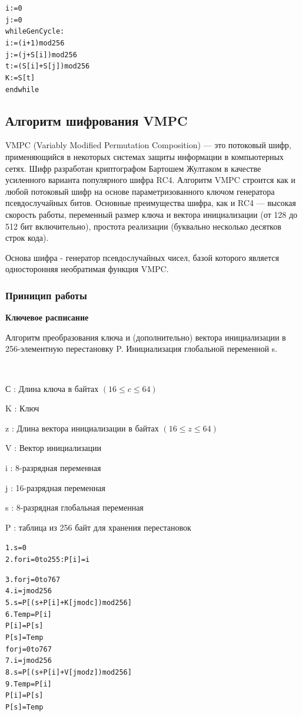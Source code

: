 \documentclass[a4paper]{report}
\begin{document}
\begin{alltt}
		i := 0
		j := 0
		while GenCycle:
    			i := ( i + 1 ) mod 256
    			j := ( j + S[i] ) mod 256
    			t := ( S[i] + S[j] ) mod 256
    			K := S[t] 
		endwhile
\end{alltt}

\newpage
\subsection{Алгоритм шифрования VMPC}
VMPC (Variably Modified Permutation Composition) — это потоковый шифр, применяющийся в некоторых системах защиты информации в компьютерных сетях. Шифр разработан криптографом Бартошем Жултаком в качестве усиленного варианта популярного шифра RC4. Алгоритм VMPC строится как и любой потоковый шифр на основе параметризованного ключом генератора псевдослучайных битов. Основные преимущества шифра, как и RC4 — высокая скорость работы, переменный размер ключа и вектора инициализации (от 128 до 512 бит включительно), простота реализации (буквально несколько десятков строк кода).

Основа шифра - генератор псевдослучайных чисел, базой которого является односторонняя необратимая функция VMPC.

\subsubsection{Приницип работы}

\textbf{Ключевое расписание}

Алгоритм преобразования ключа и (дополнительно) вектора инициализации в 256-элементную перестановку P. Инициализация глобальной переменной s.

~

С : Длина ключа в байтах $(16\leq c\leq 64)$ 

K : Ключ 

z : Длина вектора инициализации в байтах $(16\leq z\leq 64)$ 

V : Вектор инициализации 

i : 8-разрядная переменная 

j : 16-разрядная переменная 

s : 8-разрядная глобальная переменная 

P : таблица из 256 байт для хранения перестановок 

\begin{alltt}
1.  s = 0
2.  for i = 0 to 255: P[i] = i

3.  for j = 0 to 767 
	4.  i = j mod 256
	5.  s = P[(s + P[i] + K[j mod c]) mod 256]
	6.  Temp = P[i]
  	    P[i] = P[s]
  	    P[s] = Temp
	for j = 0 to 767 
7.  i = j mod 256
8.  s = P[(s + P[i] + V[j mod z]) mod 256]
9. Temp = P[i]
    P[i] = P[s]
    P[s] = Temp
\end{alltt}
 
\end{document}
